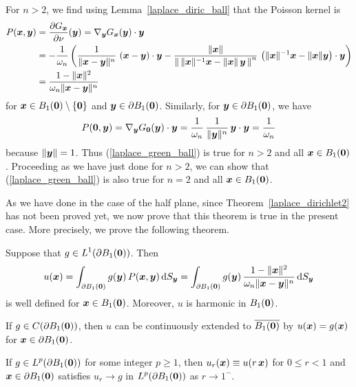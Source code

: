 For $n>2$, we find using Lemma~\ref{laplace_diric_ball} that the
Poisson kernel is
\begin{align*}
P({\bm{x}},{\bm{y}}) &= \frac{\partial{G_{{\bm{x}}}}}{\partial \nu}({\bm{y}}) =
\nabla_{{\bm{y}}} G_{{\bm{x}}}({\bm{y}}) \cdot {\bm{y}} \\
&= - \frac{1}{\omega_n} \left( \frac{1}{\| {\bm{x}} - {\bm{y}}\|^{n}}
\, \left({\bm{x}}-{\bm{y}}\right) \cdot {\bm{y}} -
\frac{\|{\bm{x}}\|}
{\left\| \, \|{\bm{x}}\|^{-1}{\bm{x}} - \|{\bm{x}}\|\,{\bm{y}}\, \right\|^{n}}
\, \left( \|{\bm{x}}\|^{-1}{\bm{x}} - \|{\bm{x}}\|{\bm{y}}
\right) \cdot {\bm{y}} \right) \\
&= \frac{1-\|{\bm{x}}\|^2}{\omega_n \|{\bm{x}}-{\bm{y}}\|^n}
\end{align*}
for ${\bm{x}} \in B_1({\bm{0}})\setminus \{{\bm{0}}\}$ and
${\bm{y}} \in \partial B_1({\bm{0}})$.  Similarly, for
${\bm{y}} \in \partial B_1({\bm{0}})$, we have
\[
P({\bm{0}},{\bm{y}}) = \nabla_{{\bm{y}}} G_{{\bm{0}}}({\bm{y}}) \cdot {\bm{y}}
= \frac{1}{\omega_n} \, \frac{1}{\|{\bm{y}}\|^{n}}
\, {\bm{y}} \cdot {\bm{y}} = \frac{1}{\omega_n}
\]
because $\|{\bm{y}}\|=1$.
Thus (\ref{laplace_green_ball}) is true for $n>2$ and all
${\bm{x}} \in B_1({\bm{0}})$.  Proceeding as we have just done for
$n>2$, we can show that (\ref{laplace_green_ball}) is also true for
$n=2$ and all ${\bm{x}} \in B_1({\bm{0}})$.

As we have done in the case of the half plane, since
Theorem~\ref{laplace_dirichlet2} has not been proved yet, we now prove
that this theorem is true in the present case.  More precisely, we
prove the following theorem.

\begin{theorem} \label{laplace_exist_ball}
Suppose that $\displaystyle g \in L^1(\partial B_1({\bm{0}}))$.  Then
\[
u({\bm{x}}) = \int_{\partial B_1({\bm{0}})} g({\bm{y}}) \,
P({\bm{x}},{\bm{y}}) \,\mathrm{d}{S}_{{\bm{y}}}
= \int_{\partial B_1({\bm{0}})} g({\bm{y}}) \,
\frac{1-\|{\bm{x}}\|^2}{\omega_n \|{\bm{x}}-{\bm{y}}\|^n} \,\mathrm{d}{S}_{{\bm{y}}}
\]
is well defined for ${\bm{x}} \in B_1({\bm{0}})$.
Moreover, $u$ is harmonic in $B_1({\bm{0}})$.

If $g\in C(\partial B_1({\bm{0}}))$, then $u$ can be
continuously extended to $\overline{B_1({\bm{0}})}$ by
$u({\bm{x}}) = g({\bm{x}})$ for ${\bm{x}} \in \partial B_1({\bm{0}})$.

If $\displaystyle g \in L^p(\partial B_1({\bm{0}}))$ for some integer
$p \geq 1$, then $u_r({\bm{x}}) \equiv u(r\,{\bm{x}})$ for $0\leq r < 1$ and
${\bm{x}} \in \partial B_1({\bm{0}})$ satisfies $u_r \rightarrow g$ in
$\displaystyle L^p(\partial B_1({\bm{0}}))$ as $r \rightarrow 1^-$.
\end{theorem}

